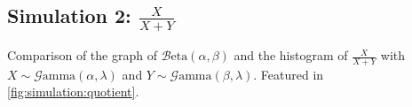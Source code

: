 \documentclass[12pt]{article}
\newcommand{\B}{\mathcal{B}}
\newcommand{\G}{\mathcal{G}}
\begin{document}
\begin{appendix}
\pagebreak
\subsection{Simulation 2: $\frac{X}{X+Y}$}
Comparison of the graph of $\B\text{eta}(\alpha, \beta)$ and the histogram of $\frac{X}{X+Y}$ with
$X\sim\G\text{amma}(\alpha, \lambda)$ and $Y\sim\G\text{amma}(\beta, \lambda)$. Featured in
\autoref{fig:simulation:quotient}.


\pagebreak
{}\listoffigures
\end{appendix}

\pagebreak{}\printbibliography[heading=bibintoc, title={References}]
\end{document}
